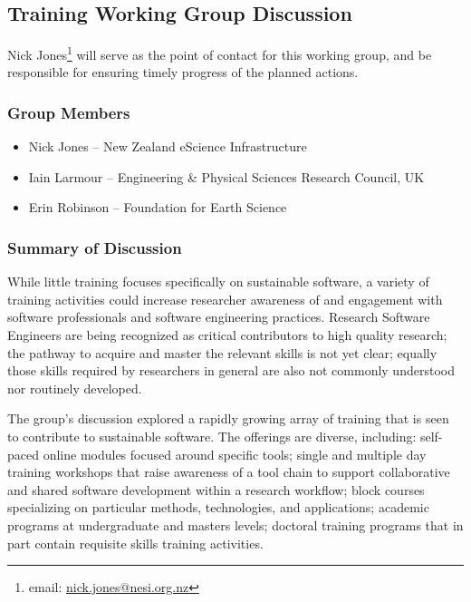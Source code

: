 \subsection{Training Working Group Discussion}
\label{sec:appendix_training}

Nick Jones\footnote{email:
\href{mailto:nick.jones@nesi.org.nz}{nick.jones@nesi.org.nz}} will serve as the
point of contact for this working group, and be responsible for ensuring timely
progress of the planned actions.

\subsubsection{Group Members}
\begin{itemize}
\item Nick Jones -- New Zealand eScience Infrastructure
\item Iain Larmour -- Engineering \& Physical Sciences Research Council, UK
\item Erin Robinson -- Foundation for Earth Science
\end{itemize}

\subsubsection{Summary of Discussion}


While little training focuses specifically on sustainable
software, a variety of training activities could increase researcher awareness of
and engagement with software professionals and software engineering practices.
Research Software Engineers are being recognized as critical contributors to
high quality research; the pathway to acquire and master the relevant skills
is not yet clear; equally those skills required by researchers in general are
also not commonly understood nor routinely developed.

The group's discussion explored a rapidly growing array of training that is seen
to contribute to sustainable software. The offerings are diverse, including:
self-paced online modules focused around specific tools; single and multiple day
training workshops that raise awareness of a tool chain to support collaborative
and shared software development within a research workflow; block courses
specializing on particular methods, technologies, and applications; academic
programs at undergraduate and masters levels; doctoral training programs that in
part contain requisite skills training activities.


